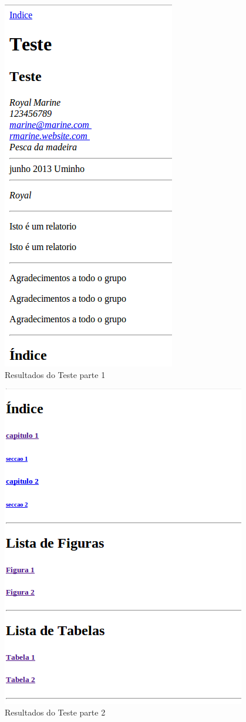 \documentclass{report}
\begin{document}
\begin{figure}[h!]
\centering
\includegraphics[scale=0.3]{HTML1.png}
\caption{Resultados do Teste parte 1}
\label{threadsVsSync}
\end{figure}

\begin{figure}[h!]
\centering
\includegraphics[scale=0.3]{HTML2.png}
\caption{Resultados do Teste parte 2}
\label{threadsVsSync}
\end{figure}
\end{document}
